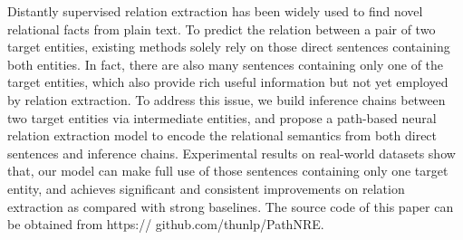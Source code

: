 Distantly supervised relation extraction has been widely used to find novel relational facts from plain text. To predict the relation between a pair of two target entities, existing methods solely rely on those direct sentences containing both entities. In fact, there are also many sentences containing only one of the target entities, which also provide rich useful information but not yet employed by relation extraction. To address this issue, we build inference chains between two target entities via intermediate entities, and propose a path-based neural relation extraction model to encode the relational semantics from both direct sentences and inference chains. Experimental results on real-world datasets show that, our model can make full use of those sentences containing only one target entity, and achieves significant and consistent improvements on relation extraction as compared with strong baselines. The source code of this paper can be obtained from https:// github.com/thunlp/PathNRE.
